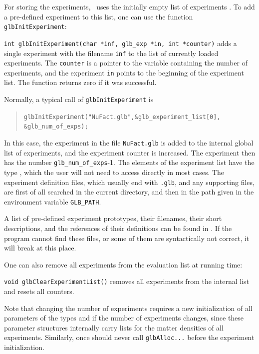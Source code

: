  
For storing the experiments, \GLOBES\ uses the initially empty list of experiments . To add a pre-defined experiment to this list, one can use the function {\tt glbInitExperiment}:
\begin{function}
{\tt int glbInitExperiment(char *inf, glb\_exp *in, int *counter)}
 adds a single experiment with the filename {\tt inf} to the list of currently loaded experiments. The {\tt counter} is a pointer to the 
 variable containing the number of experiments, and the experiment {\tt in}
 points to the beginning of the experiment list. The function returns
 zero if it was successful. 
\end{function}
Normally, a typical  call of {\tt glbInitExperiment} is 
\begin{quote}
{\tt glbInitExperiment("NuFact.glb",\&glb\_experiment\_list[0],\\  \hspace*{8cm} \&glb\_num\_of\_exps); }
\end{quote}
In this case, the experiment in the file {\tt NuFact.glb} is added to the internal global list of experiments, and the experiment counter is increased. The
experiment then has the number {\tt glb\_num\_of\_exps}-1. The elements
of the experiment list have the type , which the
user will not need to access directly in most cases. The experiment definition files, which usually end with {\tt .glb}, and any
supporting files, are first of all searched in the current directory, and then in the path given in the environment variable \verb+GLB_PATH+.
%
%

A list of pre-defined experiment prototypes, their filenames, their short descriptions, and the references of their definitions can be found in . If the program cannot find these files, or some of them are syntactically not correct, it will break at this place. 

One can also remove all experiments from the evaluation list at running
 time:
\begin{function}
{\tt void glbClearExperimentList()} removes all experiments from the internal list and resets all counters.   
\end{function}
Note that changing the number of experiments requires a new initialization
of all parameters of the types  and 
if the number of experiments changes, since these parameter structures internally carry lists for the matter densities of all experiments. Similarly, once should never call {\tt glbAlloc...} before the
experiment initialization.

